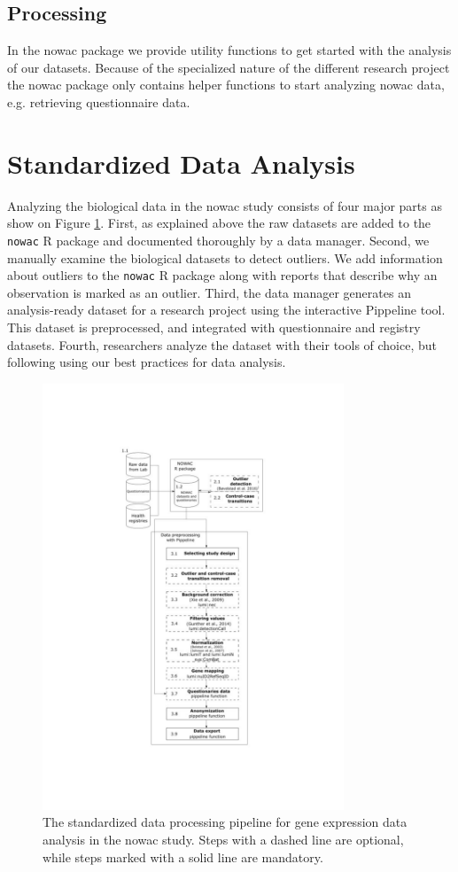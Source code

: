 \subsection{Processing} 
In the \gls{nowac} package we provide utility functions to get started with the
analysis of our datasets. Because of the specialized nature of the different
research project the \gls{nowac} package only contains helper functions to start
analyzing \gls{nowac} data, e.g. retrieving questionnaire data. 


\section{Standardized Data Analysis}
Analyzing the biological data in the \gls{nowac} study consists of four major
parts as show on Figure \ref{fig:uit_pippeline}.  First, as explained above the
raw datasets are added to the \texttt{nowac} R package and documented thoroughly
by a data manager.  Second, we manually examine the biological datasets to
detect outliers. We add information about outliers to the \texttt{nowac} R
package along with reports that describe why an observation is marked as an
outlier.  Third, the data manager generates an analysis-ready dataset for a
research project using the interactive Pippeline tool. This dataset is
preprocessed, and integrated with questionnaire and registry datasets. Fourth,
researchers analyze the dataset with their tools of choice, but following using
our best practices for data analysis.

\begin{figure}
    \centering
    \includegraphics[width=9cm]{figures/uit_pippeline.pdf}
    \caption{The standardized data processing pipeline for gene expression data
    analysis in the \gls{nowac} study. Steps with a dashed line are optional,
    while steps marked with a solid line are mandatory.}
    \label{fig:uit_pippeline}
\end{figure}


